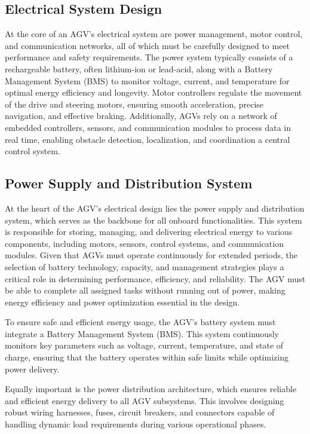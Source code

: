 \documentclass[../../main]{subfiles}
\begin{document}
\subsection{Electrical System Design}

At the core of an AGV’s electrical system are power management, motor control, 
and communication networks, all of which must be carefully designed to meet 
performance and safety requirements. The power system typically consists of 
a rechargeable battery, often lithium-ion or lead-acid, along with a Battery 
Management System (BMS) to monitor voltage, current, and temperature for 
optimal energy efficiency and longevity. Motor controllers regulate the 
movement of the drive and steering motors, ensuring smooth acceleration, 
precise navigation, and effective braking. Additionally, AGVs rely on a 
network of embedded controllers, sensors, and communication modules to 
process data in real time, enabling obstacle detection, localization, and 
coordination a central control system.

\subsection{Power Supply and Distribution System}

At the heart of the AGV's electrical design lies the 
power supply and distribution system, which serves as the backbone 
for all onboard functionalities. This system is responsible for 
storing, managing, and delivering electrical energy to various 
components, including motors, sensors, control systems, and 
communication modules. Given that AGVs must operate continuously 
for extended periods, the selection of battery technology, capacity, 
and management strategies plays a critical role in determining 
performance, efficiency, and reliability. The AGV must be able to 
complete all assigned tasks without running out of power, making 
energy efficiency and power optimization essential in the design. 

To ensure safe and efficient energy usage, the AGV's battery system 
must integrate a Battery Management System (BMS). 
This system continuously monitors key parameters such as voltage, 
current, temperature, and state of charge, ensuring that the battery 
operates within safe limits while optimizing power delivery. 

Equally important is the power distribution architecture, which 
ensures reliable and efficient energy delivery to all AGV subsystems. 
This involves designing robust wiring harnesses, fuses, circuit 
breakers, and connectors capable of handling dynamic load 
requirements during various operational phases.
\end{document}
